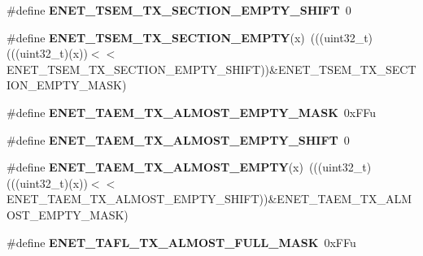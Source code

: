\begin{DoxyCompactItemize}
\item 
\#define {\bfseries E\+N\+E\+T\+\_\+\+T\+S\+E\+M\+\_\+\+T\+X\+\_\+\+S\+E\+C\+T\+I\+O\+N\+\_\+\+E\+M\+P\+T\+Y\+\_\+\+S\+H\+I\+FT}~0\hypertarget{group__ENET__Register__Masks_ga246af0bfb3c58b0af12dc0baf7142256}{}\label{group__ENET__Register__Masks_ga246af0bfb3c58b0af12dc0baf7142256}

\item 
\#define {\bfseries E\+N\+E\+T\+\_\+\+T\+S\+E\+M\+\_\+\+T\+X\+\_\+\+S\+E\+C\+T\+I\+O\+N\+\_\+\+E\+M\+P\+TY}(x)~(((uint32\+\_\+t)(((uint32\+\_\+t)(x))$<$$<$E\+N\+E\+T\+\_\+\+T\+S\+E\+M\+\_\+\+T\+X\+\_\+\+S\+E\+C\+T\+I\+O\+N\+\_\+\+E\+M\+P\+T\+Y\+\_\+\+S\+H\+I\+FT))\&E\+N\+E\+T\+\_\+\+T\+S\+E\+M\+\_\+\+T\+X\+\_\+\+S\+E\+C\+T\+I\+O\+N\+\_\+\+E\+M\+P\+T\+Y\+\_\+\+M\+A\+SK)\hypertarget{group__ENET__Register__Masks_gade2d164f1caaf77f9495ef0a25067e7e}{}\label{group__ENET__Register__Masks_gade2d164f1caaf77f9495ef0a25067e7e}

\item 
\#define {\bfseries E\+N\+E\+T\+\_\+\+T\+A\+E\+M\+\_\+\+T\+X\+\_\+\+A\+L\+M\+O\+S\+T\+\_\+\+E\+M\+P\+T\+Y\+\_\+\+M\+A\+SK}~0x\+F\+Fu\hypertarget{group__ENET__Register__Masks_ga477a6ff29213fd6111ad7c072547a40d}{}\label{group__ENET__Register__Masks_ga477a6ff29213fd6111ad7c072547a40d}

\item 
\#define {\bfseries E\+N\+E\+T\+\_\+\+T\+A\+E\+M\+\_\+\+T\+X\+\_\+\+A\+L\+M\+O\+S\+T\+\_\+\+E\+M\+P\+T\+Y\+\_\+\+S\+H\+I\+FT}~0\hypertarget{group__ENET__Register__Masks_ga7c41b19807f3598aa5cee0bf72c6c03f}{}\label{group__ENET__Register__Masks_ga7c41b19807f3598aa5cee0bf72c6c03f}

\item 
\#define {\bfseries E\+N\+E\+T\+\_\+\+T\+A\+E\+M\+\_\+\+T\+X\+\_\+\+A\+L\+M\+O\+S\+T\+\_\+\+E\+M\+P\+TY}(x)~(((uint32\+\_\+t)(((uint32\+\_\+t)(x))$<$$<$E\+N\+E\+T\+\_\+\+T\+A\+E\+M\+\_\+\+T\+X\+\_\+\+A\+L\+M\+O\+S\+T\+\_\+\+E\+M\+P\+T\+Y\+\_\+\+S\+H\+I\+FT))\&E\+N\+E\+T\+\_\+\+T\+A\+E\+M\+\_\+\+T\+X\+\_\+\+A\+L\+M\+O\+S\+T\+\_\+\+E\+M\+P\+T\+Y\+\_\+\+M\+A\+SK)\hypertarget{group__ENET__Register__Masks_ga985ae361e883de48b09f629a84cff541}{}\label{group__ENET__Register__Masks_ga985ae361e883de48b09f629a84cff541}

\item 
\#define {\bfseries E\+N\+E\+T\+\_\+\+T\+A\+F\+L\+\_\+\+T\+X\+\_\+\+A\+L\+M\+O\+S\+T\+\_\+\+F\+U\+L\+L\+\_\+\+M\+A\+SK}~0x\+F\+Fu\hypertarget{group__ENET__Register__Masks_gae28ae12fc0e108d7d8d82efce1d3d016}{}\label{group__ENET__Register__Masks_gae28ae12fc0e108d7d8d82efce1d3d016}


\end{DoxyCompactItemize}
